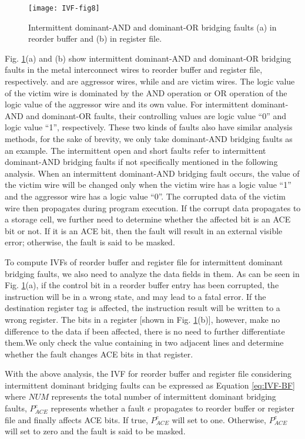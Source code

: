 \begin{figure}[t]
    \centering
    \texttt{[image: IVF-fig8]}\\
    \caption{Intermittent dominant-AND and dominant-OR bridging faults (a) in reorder buffer and (b) in register file.}
    \label{fig:IM-AND-OR}
\end{figure}


Fig. \ref{fig:IM-AND-OR}(a) and (b) show intermittent dominant-AND and dominant-OR bridging faults in the metal interconnect wires to reorder buffer and register file, respectively. and are aggressor wires, while and are victim wires. The logic value of the victim wire is dominated by the AND operation or OR operation of the logic value of the aggressor wire and its own value. For intermittent dominant-AND and dominant-OR faults, their controlling values are logic value “0” and logic value “1”, respectively. These two kinds of faults also have similar analysis methods, for the sake of brevity, we only take dominant-AND bridging faults as an example. The intermittent open and short faults refer to intermittent dominant-AND bridging faults if not specifically mentioned in the following analysis. When an intermittent dominant-AND bridging fault occurs, the value of the victim wire will be changed only when the victim wire has a logic value “1” and the aggressor wire has a logic value “0”. The corrupted data of the victim wire then propagates during program execution. If the corrupt data propagates to a storage cell, we further need to determine whether the affected bit is an ACE bit or not. If it is an ACE bit, then the fault will result in an external visible error; otherwise, the fault is said to be masked. 

To compute IVFs of reorder buffer and register file for intermittent dominant bridging faults, we also need to analyze the data fields in them. As can be seen in Fig. \ref{fig:IM-AND-OR}(a), if the control bit in a reorder buffer entry has been corrupted, the instruction will be in a wrong state, and may lead to a fatal error. If the destination register tag is affected, the instruction result will be written to a wrong register. The bits in a register [shown in Fig. \ref{fig:IM-AND-OR}(b)], however, make no difference to the data if been affected, there is no need to further differentiate them.We only check the value containing in two adjacent lines and determine whether the fault changes ACE bits in that register. 

With the above analysis, the IVF for reorder buffer and register file considering intermittent dominant bridging faults can be expressed as Equation \ref{eq:IVF-BF} where $NUM$ represents the total number of intermittent dominant bridging faults, $P_{ACE}^{e}$ represents whether a fault $e$ propagates to reorder buffer or register file and finally affects ACE bits. If true, $P_{ACE}^{e}$ will set to one. Otherwise, $P_{ACE}^{e}$ will set to zero and the fault is said to be masked.

